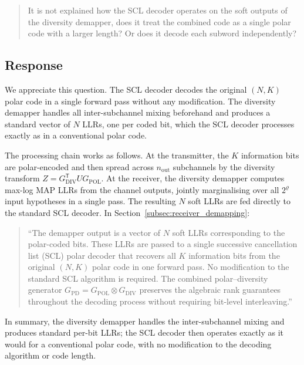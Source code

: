 \begin{mdframed}
\begin{quote}

It is not explained how the SCL decoder operates on the soft outputs of the diversity demapper, does it treat the combined code as a single polar code with a larger length? Or does it decode each subword independently?
\end{quote}

\end{mdframed}


\subsection{Response}

We appreciate this question. The SCL decoder decodes the original $(N,K)$ polar code in a single forward pass without any modification. The diversity demapper handles all inter-subchannel mixing beforehand and produces a standard vector of $N$ LLRs, one per coded bit, which the SCL decoder processes exactly as in a conventional polar code.

The processing chain works as follows. At the transmitter, the $K$ information bits are polar-encoded and then spread across $n_{\mathrm{out}}$ subchannels by the diversity transform $Z = G_{\mathrm{DIV}}^{\mathsf{T}} U G_{\mathrm{POL}}$. At the receiver, the diversity demapper computes max-log MAP LLRs from the channel outputs, jointly marginalising over all $2^{\varrho}$ input hypotheses in a single pass. The resulting $N$ soft LLRs are fed directly to the standard SCL decoder. In Section~\ref{subsec:receiver_demapping}:

\begin{quote}
``{\color{blue}The demapper output is a vector of $N$ soft LLRs corresponding to the polar-coded bits. These LLRs are passed to a single successive cancellation list (SCL) polar decoder that recovers all $K$ information bits from the original $(N,K)$ polar code in one forward pass. No modification to the standard SCL algorithm is required.} The combined polar--diversity generator $G_{\mathrm{PD}} = G_{\mathrm{POL}} \otimes G_{\mathrm{DIV}}$ preserves the algebraic rank guarantees throughout the decoding process without requiring bit-level interleaving.''
\end{quote}

In summary, the diversity demapper handles the inter-subchannel mixing and produces standard per-bit LLRs; the SCL decoder then operates exactly as it would for a conventional polar code, with no modification to the decoding algorithm or code length.

